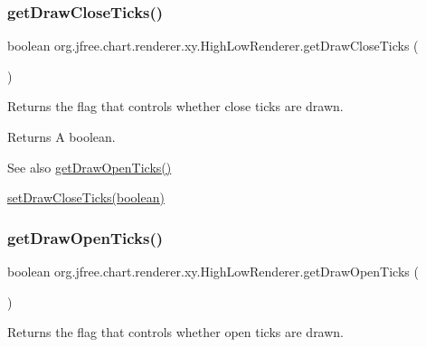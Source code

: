 \subsubsection{\texorpdfstring{get\+Draw\+Close\+Ticks()}{getDrawCloseTicks()}}
{\footnotesize\ttfamily boolean org.\+jfree.\+chart.\+renderer.\+xy.\+High\+Low\+Renderer.\+get\+Draw\+Close\+Ticks (\begin{DoxyParamCaption}{ }\end{DoxyParamCaption})}

Returns the flag that controls whether close ticks are drawn.

\begin{DoxyReturn}{Returns}
A boolean.
\end{DoxyReturn}
\begin{DoxySeeAlso}{See also}
\mbox{\hyperlink{classorg_1_1jfree_1_1chart_1_1renderer_1_1xy_1_1_high_low_renderer_af57b0bfb305076aeb2522047392adb44}{get\+Draw\+Open\+Ticks()}} 

\mbox{\hyperlink{classorg_1_1jfree_1_1chart_1_1renderer_1_1xy_1_1_high_low_renderer_aeb8b735bd5d7b60340adb7d575c9e51a}{set\+Draw\+Close\+Ticks(boolean)}} 
\end{DoxySeeAlso}
\mbox{\label{classorg_1_1jfree_1_1chart_1_1renderer_1_1xy_1_1_high_low_renderer_af57b0bfb305076aeb2522047392adb44}} 
\subsubsection{\texorpdfstring{get\+Draw\+Open\+Ticks()}{getDrawOpenTicks()}}
{\footnotesize\ttfamily boolean org.\+jfree.\+chart.\+renderer.\+xy.\+High\+Low\+Renderer.\+get\+Draw\+Open\+Ticks (\begin{DoxyParamCaption}{ }\end{DoxyParamCaption})}

Returns the flag that controls whether open ticks are drawn.

